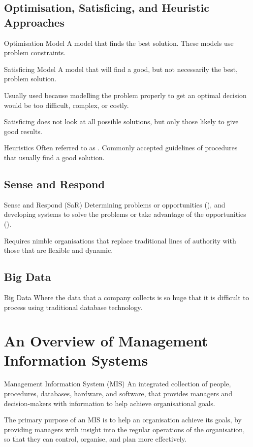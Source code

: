 \documentclass[\main/notes.tex]{subfiles}
\begin{document}
			\subsection{Optimisation, Satisficing, and Heuristic Approaches}
				\begin{definition}{Optimisation Model}
					A model that finds the best solution. These models use problem constraints.
				\end{definition}
				\begin{definition}{Satisficing Model}
					A model that will find a good, but not necessarily the best, problem solution.

					Usually used because modelling the problem properly to get an optimal decision would be too difficult, complex, or costly.

					Satisficing does not look at all possible solutions, but only those likely to give good results.
				\end{definition}
				\begin{definition}{Heuristics}
					Often referred to as . Commonly accepted guidelines of procedures that usually find a good solution.
				\end{definition}
			\subsection{Sense and Respond}
				\begin{definition}{Sense and Respond (SaR)}
					Determining problems or opportunities (), and developing systems to solve the problems or take advantage of the opportunities ().

					Requires nimble organisations that replace traditional lines of authority with those that are flexible and dynamic.
				\end{definition}
			\subsection{Big Data}
				\begin{definition}{Big Data}
					Where the data that a company collects is so huge that it is difficult to process using traditional database technology.
				\end{definition}

		\pagebreak
		\section{An Overview of Management Information Systems}
			\begin{definition}{Management Information System (MIS)}
				An integrated collection of people, procedures, databases, hardware, and software, that provides managers and decision-makers with information to help achieve organisational goals.

				The primary purpose of an MIS is to help an organisation achieve its goals, by providing managers with insight into the regular operations of the organisation, so that they can control, organise, and plan more effectively.
			\end{definition}
\end{document}
